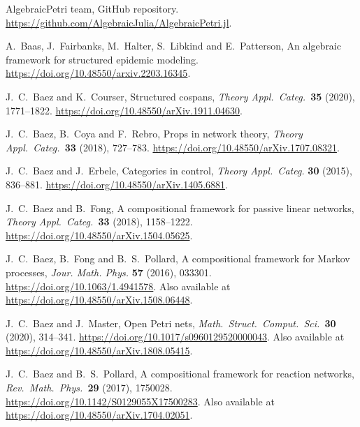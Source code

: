 \documentclass[ a4paper, onecolumn, superscriptaddress,10pt, accepted=2022-02-14, issue=3, volume=4, shorttitle=papers/compositionality-4-3 ]{compositionalityarticle}
\begin{document}
\begin{thebibliography}{100}

 AlgebraicPetri team, GitHub repository.
\href{https://github.com/AlgebraicJulia/AlgebraicPetri.jl}{https://github.com/AlgebraicJulia/AlgebraicPetri.jl}.

  A.\ Baas, J.\ Fairbanks, M.\ Halter, S.\ Libkind and E.\ Patterson, An
algebraic framework for structured epidemic modeling.  \href{https://doi.org/10.48550/arxiv.2203.16345}{https://doi.org/10.48550/arxiv.2203.16345}.

 J.\ C.\ Baez and K.\ Courser, Structured cospans,  \textsl{Theory Appl.\ Categ.\ }\textbf{35} (2020), 1771--1822.    	\href{https://doi.org/10.48550/arXiv.1911.04630}{https://doi.org/10.48550/arXiv.1911.04630}.

 J.\ C.\ Baez, B.\ Coya and F.\ Rebro, Props in network theory, \textsl{Theory Appl.\ Categ.\ }\textbf{33} (2018), 727--783.    	\href{https://doi.org/10.48550/arXiv.1707.08321}{https://doi.org/10.48550/arXiv.1707.08321}.

 J.\ C.\ Baez and J.\ Erbele, Categories in control, \textsl{Theory Appl.\ Categ.} {\bf 30} (2015), 836--881.  \href{https://doi.org/10.48550/arXiv.1405.6881}{https://doi.org/10.48550/arXiv.1405.6881}.

  J.\ C.\ Baez and B.\ Fong, A compositional framework for passive linear networks, \textsl{Theory Appl.\ Categ.\ }\textbf{33} (2018), 1158--1222.  \href{https://doi.org/10.48550/arXiv.1504.05625}{https://doi.org/10.48550/arXiv.1504.05625}.

 J.\ C.\ Baez, B.\ Fong and B.\ S.\ Pollard, A compositional framework for Markov processes, \textsl{Jour. Math. Phys.} \textbf{57} (2016), 033301.
\href{https://doi.org/10.1063/1.4941578}{https://doi.org/10.1063/1.4941578}. Also available at
\href{https://doi.org/10.48550/arXiv.1508.06448}{https://doi.org/10.48550/arXiv.1508.06448}.

  J.\ C.\ Baez and J.\ Master, Open Petri nets, \textsl{Math.\ Struct.\ Comput.\ Sci.\ }\textbf{30} (2020), 314--341.  \href{https://doi.org/10.1017/s0960129520000043}{https://doi.org/10.1017/s0960129520000043}.
Also available at
\href{https://doi.org/10.48550/arXiv.1808.05415}{https://doi.org/10.48550/arXiv.1808.05415}.

 J.\ C.\ Baez and B.\ S.\ Pollard, A compositional framework for reaction networks, \textsl{Rev.\ Math.\ Phys.\ }\textbf{29}
(2017), 1750028. \href{https://doi.org/10.1142/S0129055X17500283}{https://doi.org/10.1142/S0129055X17500283}.   Also available at
\href{https://doi.org/10.48550/arXiv.1704.02051}{https://doi.org/10.48550/arXiv.1704.02051}.


\end{thebibliography}
\end{document}
